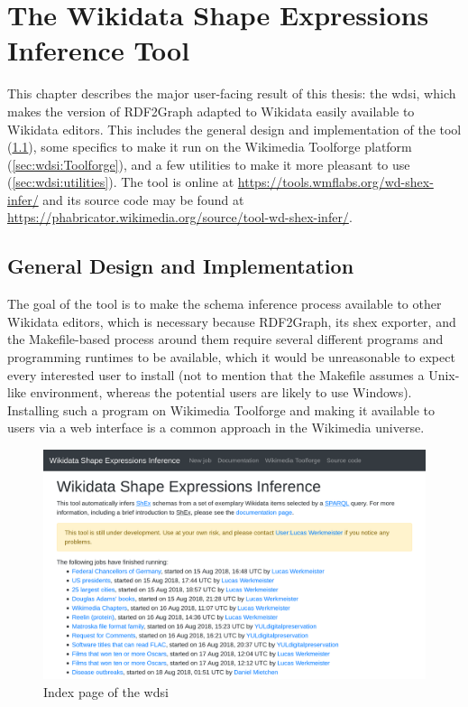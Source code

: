 \chapter{The Wikidata Shape Expressions Inference Tool}
\label{ch:wdsi}

This chapter describes the major user-facing result of this thesis:
the \gls{wdsi},
which makes the version of \gls{RDF2Graph} adapted to \gls{Wikidata}
easily available to \gls{Wikidata} editors.
This includes the general design and implementation of the tool (\cref{sec:wdsi:abstract}),
some specifics to make it run on the \gls{Wikimedia Toolforge} platform (\cref{sec:wdsi:Toolforge}),
and a few utilities to make it more pleasant to use (\cref{sec:wdsi:utilities}).
The tool is online at \url{https://tools.wmflabs.org/wd-shex-infer/}
and its source code may be found at \url{https://phabricator.wikimedia.org/source/tool-wd-shex-infer/}.

\section{General Design and Implementation}
\label{sec:wdsi:abstract}

The goal of the tool is to make the \gls{schema} inference process available to other \gls{Wikidata} editors,
which is necessary because \gls{RDF2Graph}, its \gls{shex} exporter, and the Makefile-based process around them
require several different programs and programming runtimes to be available,
which it would be unreasonable to expect every interested user to install
(not to mention that the Makefile assumes a Unix-like environment,
whereas the potential users are likely to use Windows).
Installing such a program on \gls{Wikimedia Toolforge}
and making it available to users via a web interface
is a common approach in the \gls{Wikimedia} universe.

\begin{figure}
  \includegraphics[width=\textwidth]{screenshots/wdsi-index}
  \caption{Index page of the \gls{wdsi}}
  \label{fig:wdsi-index}
\end{figure}

